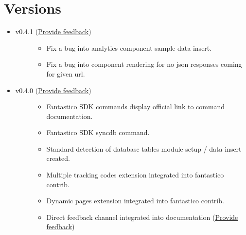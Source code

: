 \documentclass[letterpaper,10pt,english]{sphinxmanual}
\begin{document}
\section{Versions}
\label{changes:versions}\begin{itemize}
\item {} \begin{description}
\item[{v0.4.1 (\href{https://docs.google.com/forms/d/1tKBopU3lfDB\_w8F4h7Rl1Rn4uydAJq-nha09L\_ptJck/edit?usp=sharing}{Provide feedback})}] \leavevmode\begin{itemize}
\item {} 
Fix a bug into analytics component sample data insert.

\item {} 
Fix a bug into component rendering for no json responses coming for given url.

\end{itemize}

\end{description}

\item {} \begin{description}
\item[{v0.4.0 (\href{https://docs.google.com/forms/d/1tKBopU3lfDB\_w8F4h7Rl1Rn4uydAJq-nha09L\_ptJck/edit?usp=sharing}{Provide feedback})}] \leavevmode\begin{itemize}
\item {} 
Fantastico SDK commands display official link to command documentation.

\item {} 
Fantastico SDK syncdb command.

\item {} 
Standard detection of database tables module setup / data insert created.

\item {} 
Multiple tracking codes extension integrated into fantastico contrib.

\item {} 
Dynamic pages extension integrated into fantastico contrib.

\item {} 
Direct feedback channel integrated into documentation (\href{https://docs.google.com/forms/d/1tKBopU3lfDB\_w8F4h7Rl1Rn4uydAJq-nha09L\_ptJck/edit?usp=sharing}{Provide feedback})

\end{itemize}


\end{description}
\end{itemize}
\end{document}
